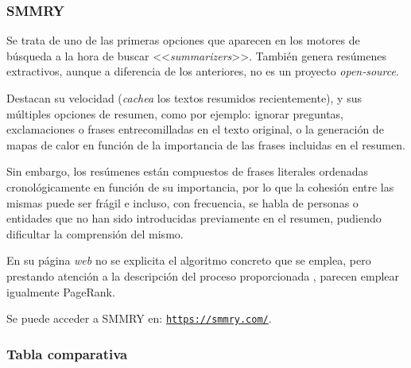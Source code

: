 \bigskip
\subsubsection{SMMRY}

Se trata de uno de las primeras opciones que aparecen en los motores de búsqueda a la hora de buscar <<\emph{summarizers}>>. También genera resúmenes extractivos, aunque a diferencia de los anteriores, no es un proyecto \emph{open-source}.

Destacan su velocidad (\emph{cachea} los textos resumidos recientemente), y sus múltiples opciones de resumen, como por ejemplo: ignorar preguntas, exclamaciones o frases entrecomilladas en el texto original, o la generación de mapas de calor en función de la importancia de las frases incluidas en el resumen.

Sin embargo, los resúmenes están compuestos de frases literales ordenadas cronológicamente en función de su importancia, por lo que la cohesión entre las mismas puede ser frágil e incluso, con frecuencia, se habla de personas o entidades que no han sido introducidas previamente en el resumen, pudiendo dificultar la comprensión del mismo.

En su página \emph{web} no se explicita el algoritmo concreto que se emplea, pero prestando atención a la descripción del proceso proporcionada \cite{smmry}, parecen emplear igualmente PageRank.

Se puede acceder a SMMRY en:
\href{https://smmry.com/}{\texttt{{\small https://smmry.com/}}}.

\newpage
\subsubsection{Tabla comparativa}

